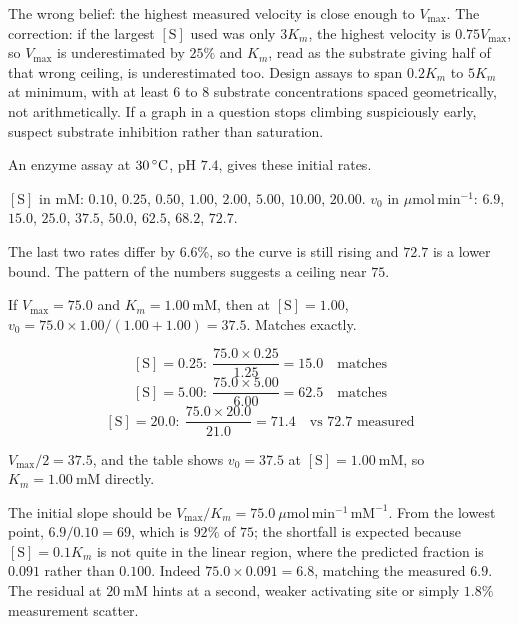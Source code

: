 \begin{warnbox}[title={TRAP: eyeballing $V_{\max}$ off an unsaturated curve}]
The wrong belief: the highest measured velocity is close enough to $V_{\max}$. The
correction: if the largest $[\mathrm{S}]$ used was only $3K_m$, the highest velocity is
$0.75V_{\max}$, so $V_{\max}$ is underestimated by $25\%$ and $K_m$, read as the
substrate giving half of that wrong ceiling, is underestimated too. Design assays to
span $0.2K_m$ to $5K_m$ at minimum, with at least $6$ to $8$ substrate concentrations
spaced geometrically, not arithmetically. If a graph in a question stops climbing
suspiciously early, suspect substrate inhibition rather than saturation.
\end{warnbox}

\begin{calcbox}[title={WORKED: parameters read straight from an initial-rate table}]
An enzyme assay at $30\,^{\circ}\mathrm{C}$, pH $7.4$, gives these initial rates.

$[\mathrm{S}]$ in $\mathrm{mM}$: $0.10$, $0.25$, $0.50$, $1.00$, $2.00$, $5.00$,
$10.00$, $20.00$.
$v_0$ in $\mu\mathrm{mol\,min^{-1}}$: $6.9$, $15.0$, $25.0$, $37.5$, $50.0$, $62.5$,
$68.2$, $72.7$.

 The last two rates differ by $6.6\%$, so the curve
is still rising and $72.7$ is a lower bound. The pattern of the numbers suggests a
ceiling near $75$.

 If $V_{\max}=75.0$ and $K_m=1.00\ \mathrm{mM}$, then
at $[\mathrm{S}]=1.00$, $v_0=75.0\times1.00/(1.00+1.00)=37.5$. Matches exactly.

\[
[\mathrm{S}]=0.25:\ \frac{75.0\times0.25}{1.25}=15.0\quad\text{matches}
\]
\[
[\mathrm{S}]=5.00:\ \frac{75.0\times5.00}{6.00}=62.5\quad\text{matches}
\]
\[
[\mathrm{S}]=20.0:\ \frac{75.0\times20.0}{21.0}=71.4\quad\text{vs }72.7\text{ measured}
\]

 $V_{\max}/2=37.5$, and the table
shows $v_0=37.5$ at $[\mathrm{S}]=1.00\ \mathrm{mM}$, so
$K_m=1.00\ \mathrm{mM}$ directly.

 The initial slope should be $V_{\max}/K_m=75.0\
\mu\mathrm{mol\,min^{-1}\,mM^{-1}}$. From the lowest point,
$6.9/0.10=69$, which is $92\%$ of $75$; the shortfall is expected because
$[\mathrm{S}]=0.1K_m$ is not quite in the linear region, where the predicted fraction
is $0.091$ rather than $0.100$. Indeed $75.0\times0.091=6.8$, matching the measured
$6.9$. \tm{$\surd$} The residual at $20\ \mathrm{mM}$ hints at a second, weaker
activating site or simply $1.8\%$ measurement scatter.
\end{calcbox}

